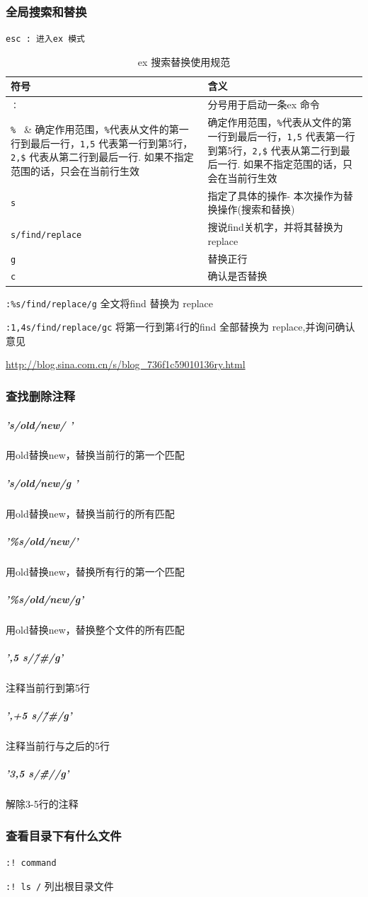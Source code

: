 \documentclass[UTF8,a4paper,12pt]{ctexbook}
\begin{document}
			\subsubsection{全局搜索和替换}
				\verb|esc : 进入ex 模式|
				\begin{table}[H]
					\centering
					\caption{ex 搜索替换使用规范}
					\begin{tabular}{l|m{13cm}}
						\hline
						符号 	   	   & 含义\\
						\hline
						\verb|：|	&  分号用于启动一条ex 命令\\
						\verb|% |	 &  确定作用范围，\verb|%|代表从文件的第一行到最后一行，\verb|1,5| 代表第一行到第5行，\verb|2,$| 代表从第二行到最后一行. 如果不指定范围的话，只会在当前行生效\\
						\verb|s |	 &  指定了具体的操作- 本次操作为替换操作(搜索和替换)\\
						\verb|s/find/replace|		&  搜说find关机字，并将其替换为replace\\
						\verb|g |	 &  替换正行\\
						\verb|c |	 &  确认是否替换\\
						\hline
					\end{tabular}
				\end{table}	
				
				\verb|:%s/find/replace/g| 全文将find 替换为 replace
				
				\verb|:1,4s/find/replace/gc| 将第一行到第4行的find 全部替换为 replace,并询问确认意见
				
				\url{http://blog.sina.com.cn/s/blog_736f1c59010136ry.html}
			\subsubsection{查找删除注释}
				\subparagraph{'s/old/new/ '}用old替换new，替换当前行的第一个匹配
				\subparagraph{'s/old/new/g '}用old替换new，替换当前行的所有匹配
				\subparagraph{'\%s/old/new/'}用old替换new，替换所有行的第一个匹配
				\subparagraph{'\%s/old/new/g'}用old替换new，替换整个文件的所有匹配
				\subparagraph{',5 s/\^ /\#/g'} 注释当前行到第5行
				\subparagraph{',+5 s/\^ /\#/g'} 注释当前行与之后的5行
				\subparagraph{'3,5 s/\^ \#//g'} 解除3-5行的注释	
			
			\subsubsection{查看目录下有什么文件}
				\verb|:! command|
				
				
				\verb|:! ls /| 列出根目录文件			
\end{document}
